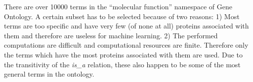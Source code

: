 \documentclass[11pt,twoside,a4paper]{book}
\begin{document}
There are over 10000 terms in the ``molecular function'' namespace of Gene Ontology.
A certain subset has to be selected because of two reasons:
1) Most terms are too specific and have very few (of none at all) proteins associated with them
and therefore are useless for machine learning.
2) The performed computations are difficult and computational resources are finite.
Therefore only the terms which have the most proteins associated with them are used.
Due to the transitivity of the \emph{is\_a} relation,
these also happen to be some of the most general terms in the ontology.                                                                                                                                                                                                                                                                                                                                                                                                                                                                                                                                                                                                                                                                                                                                                                                                                                                                                                                                                                                         
                                                                                                                                                                                                                                                                                                                                                                                                                                                                                                                                                                                                                                                                                                                                               
\end{document}
